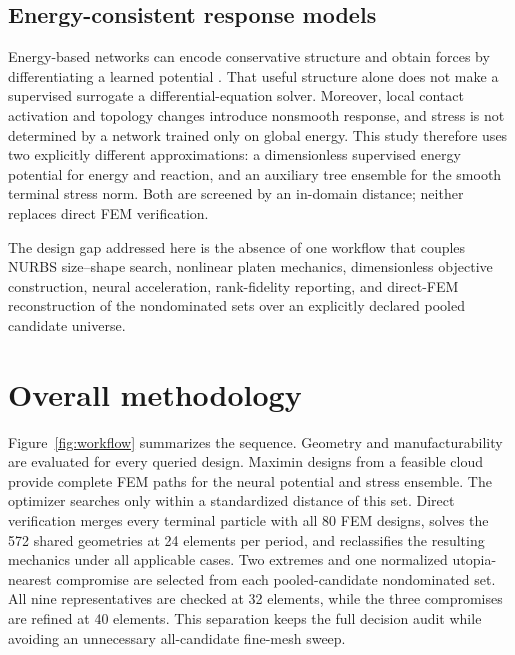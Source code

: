 \documentclass[11pt]{article}
\begin{document}
\subsection{Energy-consistent response models}

Energy-based networks can encode conservative structure and obtain forces by differentiating a learned potential \citep{Samaniego2020,NguyenThanh2020}. That useful structure alone does not make a supervised surrogate a differential-equation solver. Moreover, local contact activation and topology changes introduce nonsmooth response, and stress is not determined by a network trained only on global energy. This study therefore uses two explicitly different approximations: a dimensionless supervised energy potential for energy and reaction, and an auxiliary tree ensemble for the smooth terminal stress norm. Both are screened by an in-domain distance; neither replaces direct FEM verification.

The design gap addressed here is the absence of one workflow that couples NURBS size--shape search, nonlinear platen mechanics, dimensionless objective construction, neural acceleration, rank-fidelity reporting, and direct-FEM reconstruction of the nondominated sets over an explicitly declared pooled candidate universe.

\section{Overall methodology}

Figure~\ref{fig:workflow} summarizes the sequence. Geometry and manufacturability are evaluated for every queried design. Maximin designs from a feasible cloud provide complete FEM paths for the neural potential and stress ensemble. The optimizer searches only within a standardized distance of this set. Direct verification merges every terminal particle with all 80 FEM designs, solves the 572 shared geometries at 24 elements per period, and reclassifies the resulting mechanics under all applicable cases. Two extremes and one normalized utopia-nearest compromise are selected from each pooled-candidate nondominated set. All nine representatives are checked at 32 elements, while the three compromises are refined at 40 elements. This separation keeps the full decision audit while avoiding an unnecessary all-candidate fine-mesh sweep.
\end{document}

